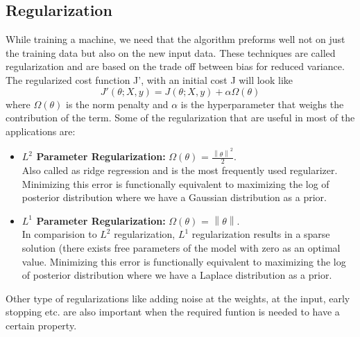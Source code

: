 \documentclass{article}
\newcommand{\norm}[1]{\left\lVert#1\right\rVert}
\begin{document}
\subsection{Regularization}
While training a machine, we need that the algorithm preforms well not on just the training data but also on the new input data. These techniques are called regularization and are based on the trade off between bias for reduced variance. The regularized cost function J', with an initial cost J will look like
\begin{equation}
J'(\theta;X,y) = J(\theta;X,y) + \alpha\Omega(\theta)
\end{equation}
\hspace{1.5cm} where $\Omega(\theta)$ is the norm penalty and $\alpha$ is the hyperparameter that weighs the contribution of the term.
Some of the regularization that are useful in most of the applications are:

\begin{itemize}

\item \textbf{$L^2$ Parameter Regularization:} $\Omega(\theta)$ = $\frac{\norm{ \theta }^2}{2}$. 
\\Also called as ridge regression and is the most frequently used regularizer. Minimizing this error is functionally equivalent to maximizing the log of posterior distribution where we have a Gaussian distribution as a prior.

\item \textbf{$L^1$ Parameter Regularization:} $\Omega(\theta)$ = $\norm{ \theta }$.
\\In comparision to $L^2$ regularization, $L^1$ regularization results in a sparse solution (there exists free parameters of the model with zero as an optimal value. Minimizing this error is functionally equivalent to maximizing the log of posterior distribution where we have a Laplace distribution as a prior.

\end{itemize}

Other type of regularizations like adding noise at the weights, at the input, early stopping etc. are also important when the required funtion is needed to have a certain property.
\end{document}
